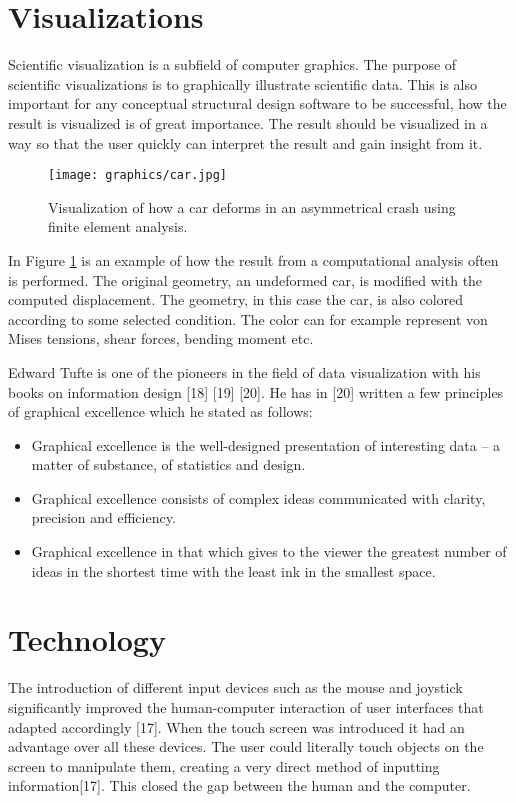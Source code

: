 \section{Visualizations}
Scientific visualization is a subfield of computer graphics. The purpose of scientific visualizations is to graphically illustrate scientific data. This is also important for any conceptual structural design software to be successful, how the result is visualized is of great importance. The result should be visualized in a way so that the user quickly can interpret the result and gain insight from it. 

\begin{figure}
  \texttt{[image: graphics/car.jpg]}
  \caption{Visualization of how a car deforms in an asymmetrical crash using finite element analysis.}
  \label{fig:Car}
\end{figure}

In Figure \ref{fig:Car} is an example of how the result from a computational analysis often is performed. The original geometry, an undeformed car, is modified with the computed displacement. The geometry, in this case the car, is also colored according to some selected condition. The color can for example represent von Mises tensions, shear forces, bending moment etc. 

Edward Tufte is one of the pioneers in the field of data visualization with his books on information design [18] [19] [20]. He has in [20] written a few principles of graphical excellence which he stated as follows:

\begin{itemize} 
\item Graphical excellence is the well-designed presentation of interesting data – a matter of substance, of statistics and design.
\item Graphical excellence consists of complex ideas communicated with clarity, precision and efficiency.
\item Graphical excellence in that which gives to the viewer the greatest number of ideas in the shortest time with the least ink in the smallest space.
\end{itemize} 

\section{Technology}
The introduction of different input devices such as the mouse and joystick significantly improved the human-computer interaction of user interfaces that adapted accordingly [17]. When the touch screen was introduced it had an advantage over all these devices. The user could literally touch objects on the screen to manipulate them, creating a very direct method of inputting information[17]. This closed the gap between the human and the computer.

